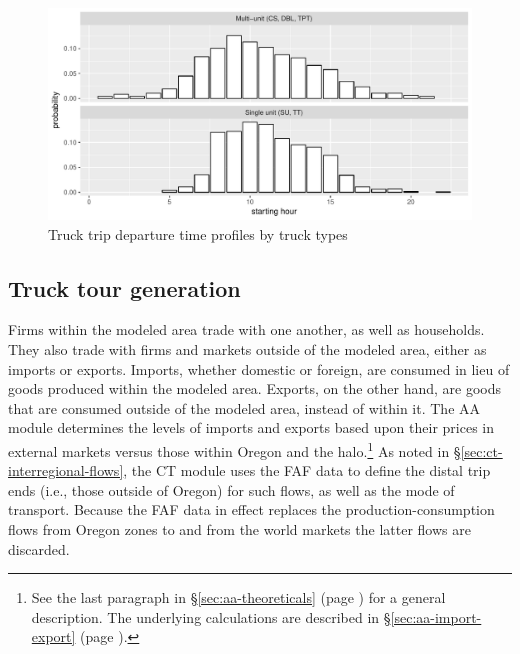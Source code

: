 \begin{figure}
\centering
\includegraphics[width=6.25in]{ct/trip-start-hour.pdf}
\caption{Truck trip departure time profiles by truck types}
\label{fig:ct-trip-departure-times}
\end{figure}

\subsection{Truck tour generation}\label{sec:ct-tour-generation}
Firms within the modeled area trade with one another, as well as households. They also trade with firms and markets outside of the modeled area, either as imports or exports. Imports, whether domestic or foreign, are consumed in lieu of goods produced within the modeled area. Exports, on the other hand, are goods that are consumed outside of the modeled area, instead of within it. The AA module determines the levels of imports and exports based upon their prices in external markets versus those within Oregon and the halo.\footnote{See the last paragraph in \S\ref{sec:aa-theoreticals} (page \pageref{sec:aa-theoreticals}) for a general description. The underlying calculations are described in \S\ref{sec:aa-import-export} (page \pageref{sec:aa-import-export}).} As noted in \S\ref{sec:ct-interregional-flows}, the CT module uses the FAF data to define the distal trip ends (i.e., those outside of Oregon) for such flows, as well as the mode of transport. Because the FAF data in effect replaces the production-consumption flows from Oregon zones to and from the world markets the latter flows are discarded. 

